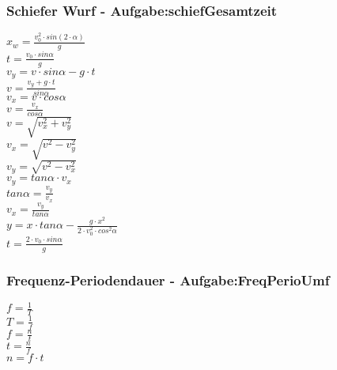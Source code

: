 \subsubsection{Schiefer Wurf  - Aufgabe:schiefGesamtzeit} 
\begin{minipage}{0.45\textwidth} 
$ x_{w}  = \frac{v_{0} ^{2} \cdot sin(2\cdot \alpha )}{       g} $\\ 
$ t =\frac{v_{0} \cdot sin \alpha }{  g} $\\ 
$ v_{y}  =  v\cdot sin\alpha - g\cdot t $\\ 
$ v= \frac{ v_{y} +g\cdot t}{ sin\alpha } $\\ 
$ v_{x}  = v\cdot  cos\alpha $\\ 
$ v= \frac{ v_{x} }{ cos\alpha } $\\ 
$ v= \sqrt{ v_{x} ^{2} + v_{y} ^{2} } $\\ 
$ v_{x} = \sqrt{ v^{2}  - v_{y} ^{2} } $\\ 
$ v_{y} = \sqrt{ v^{2}  - v_{x} ^{2} } $\\ 
$ v_{y} = tan \alpha \cdot  v_{x} $\\ 
$ tan \alpha = \frac{v_{y} }{v_{x} } $\\ 
$ v_{x} = \frac{v_{y} }{tan \alpha } $\\ 
$ y = x\cdot tan \alpha  - \frac{   g\cdot x^{2} }{2\cdot v^{2} _{0} \cdot cos ^{2}\alpha } $\\ 
$ t =\frac{2\cdot v_{0} \cdot sin \alpha }{ g} $\\ 
\end{minipage} 
\begin{minipage}{0.45\textwidth} 
 
\end{minipage} 
\subsubsection{Frequenz-Periodendauer - Aufgabe:FreqPerioUmf} 
\begin{minipage}{0.45\textwidth} 
$ f = \frac{1}{T} $\\ 
$ T = \frac{1}{f} $\\ 
$ f = \frac{n}{t} $\\ 
$ t = \frac{n}{f} $\\ 
$ n = f\cdot t $\\ 
\end{minipage} 
\begin{minipage}{0.45\textwidth} 
 
\end{minipage} 
